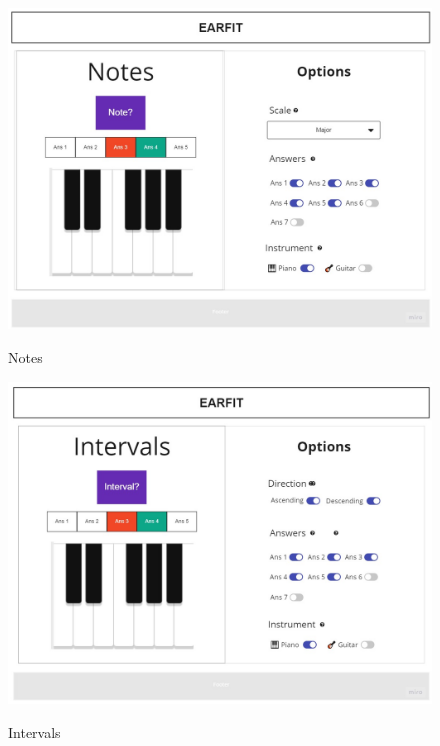 \documentclass[12pt,twoside,titlepage]{report}
\begin{document}
\begin{figure}[H]
    \centering
    \includegraphics[scale=0.3]{Design Thinking/Prototipo/Medium/Notes}
    \label{fig:Notes}
    \caption{Notes}
\end{figure}

\begin{figure}[H]
    \centering
    \includegraphics[scale=0.3]{Design Thinking/Prototipo/Medium/Intervals}
    \label{fig:Intervals}
    \caption{Intervals}
\end{figure}
\end{document}
